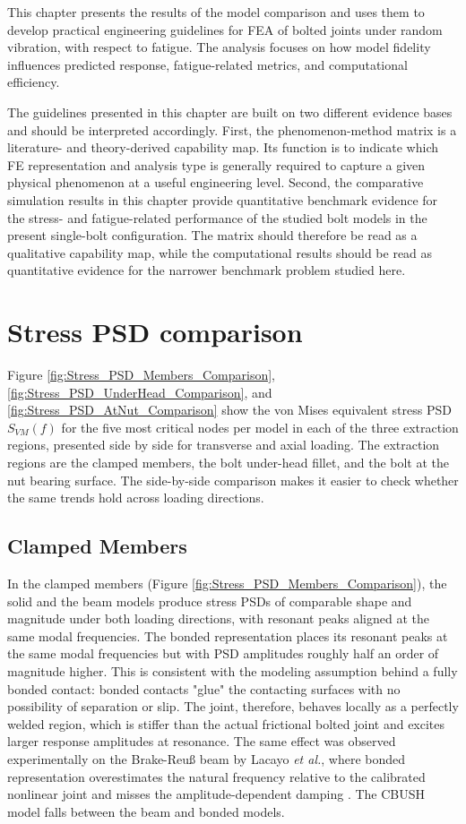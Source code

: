 \documentclass[a4paper,twoside]{bth}
\begin{document}
This chapter presents the results of the model comparison and uses them to develop practical engineering guidelines for \ac{FEA} of bolted joints under random vibration, with respect to fatigue. The analysis focuses on how model fidelity influences predicted response, fatigue-related metrics, and computational efficiency.

The guidelines presented in this chapter are built on two different evidence bases and should be interpreted accordingly. First, the phenomenon-method matrix is a literature- and theory-derived capability map. Its function is to indicate which \ac{FE} representation and analysis type is generally required to capture a given physical phenomenon at a useful engineering level. Second, the comparative simulation results in this chapter provide quantitative benchmark evidence for the stress- and fatigue-related performance of the studied bolt models in the present single-bolt configuration. The matrix should therefore be read as a qualitative capability map, while the computational results should be read as quantitative evidence for the narrower benchmark problem studied here.

\section{Stress PSD comparison}
Figure \ref{fig:Stress_PSD_Members_Comparison}, \ref{fig:Stress_PSD_UnderHead_Comparison}, and \ref{fig:Stress_PSD_AtNut_Comparison} show the von Mises equivalent stress \ac{PSD} $S_{VM}(f)$ for the five most critical nodes per model in each of the three extraction regions, presented side by side for transverse and axial loading. The extraction regions are the clamped members, the bolt under-head fillet, and the bolt at the nut bearing surface. The side-by-side comparison makes it easier to check whether the same trends hold across loading directions.

\subsection{Clamped Members}

In the clamped members (Figure \ref{fig:Stress_PSD_Members_Comparison}), the solid and the beam models produce stress PSDs of comparable shape and magnitude under both loading directions, with resonant peaks aligned at the same modal frequencies. The bonded representation places its resonant peaks at the same modal frequencies but with \ac{PSD} amplitudes roughly half an order of magnitude higher. This is consistent with the modeling assumption behind a fully bonded contact: bonded contacts "glue" the contacting surfaces with no possibility of separation or slip. The joint, therefore, behaves locally as a perfectly welded region, which is stiffer than the actual frictional bolted joint and excites larger response amplitudes at resonance. The same effect was observed experimentally on the Brake-Reuß beam by Lacayo \textit{et al.}, where bonded representation overestimates the natural frequency relative to the calibrated nonlinear joint and misses the amplitude-dependent damping \cite{15}.
The CBUSH model falls between the beam and bonded models.
\end{document}
